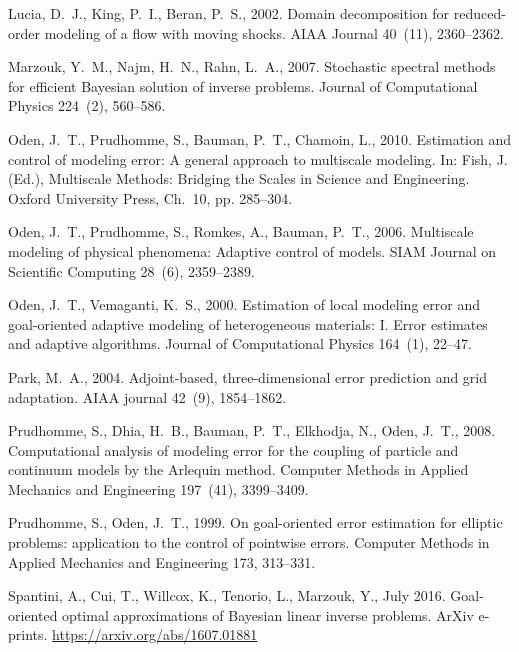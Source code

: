 \documentclass[review,sort&compress]{elsarticle}
\begin{document}
\begin{thebibliography}{42}
Lucia, D.~J., King, P.~I., Beran, P.~S., 2002. Domain decomposition for
  reduced-order modeling of a flow with moving shocks. AIAA Journal 40~(11),
  2360--2362.

Marzouk, Y.~M., Najm, H.~N., Rahn, L.~A., 2007. Stochastic spectral methods for
  efficient {B}ayesian solution of inverse problems. Journal of Computational
  Physics 224~(2), 560--586.

Oden, J.~T., Prudhomme, S., Bauman, P.~T., Chamoin, L., 2010. Estimation and
  control of modeling error: A general approach to multiscale modeling. In:
  Fish, J. (Ed.), Multiscale Methods: Bridging the Scales in Science and
  Engineering. Oxford University Press, Ch.~10, pp. 285--304.

Oden, J.~T., Prudhomme, S., Romkes, A., Bauman, P.~T., 2006. Multiscale
  modeling of physical phenomena: Adaptive control of models. SIAM Journal on
  Scientific Computing 28~(6), 2359--2389.

Oden, J.~T., Vemaganti, K.~S., 2000. Estimation of local modeling error and
  goal-oriented adaptive modeling of heterogeneous materials: {I}. {E}rror
  estimates and adaptive algorithms. Journal of Computational Physics 164~(1),
  22--47.

Park, M.~A., 2004. Adjoint-based, three-dimensional error prediction and grid
  adaptation. AIAA journal 42~(9), 1854--1862.

Prudhomme, S., Dhia, H.~B., Bauman, P.~T., Elkhodja, N., Oden, J.~T., 2008.
  Computational analysis of modeling error for the coupling of particle and
  continuum models by the {A}rlequin method. Computer Methods in Applied
  Mechanics and Engineering 197~(41), 3399--3409.

Prudhomme, S., Oden, J.~T., 1999. On goal-oriented error estimation for
  elliptic problems: application to the control of pointwise errors. Computer
  Methods in Applied Mechanics and Engineering 173, 313--331.

Spantini, A., Cui, T., Willcox, K., Tenorio, L., Marzouk, Y., July 2016.
  Goal-oriented optimal approximations of {B}ayesian linear inverse problems.
  ArXiv e-prints.
\newline\urlprefix\url{https://arxiv.org/abs/1607.01881}


\end{thebibliography}
\end{document}
